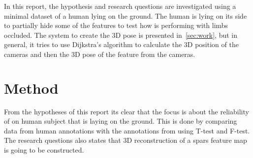 In this report, the hypothesis and research questions are investigated using a minimal dataset of a human lying on the ground.
The human is lying on its side to partially hide some of the features to test how \openpose{ } is performing with limbs occluded.
The system to create the 3D pose is presented in~\ref{sec:work}, but in general, it tries to use Dijkstra's algorithm to calculate the 3D position of the cameras and then the 3D pose of the feature from the cameras.







\section{Method}
\label{sec:method}
From the hypotheses of this report its clear that the focus is about the reliability of \openpose{ } on human subject that is laying on the ground.
This is done by comparing  data from human annotations with the annotations from \operpose{} using T-test and F-test.
The research questions also states that 3D reconstruction of a spars feature map is going to be constructed.





